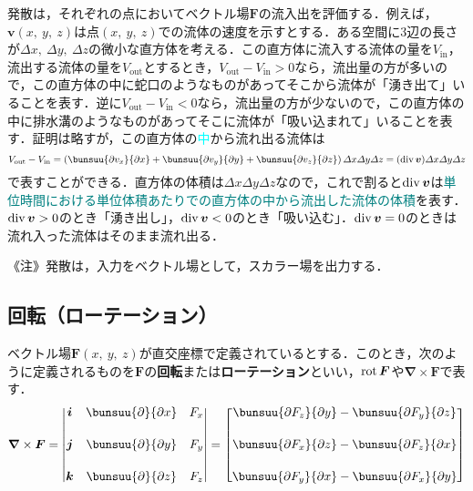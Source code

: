 発散は，それぞれの点においてベクトル場$\bm{F}$の流入出を評価する．例えば，$\bm{v}(x,\ y,\ z)$は点$(x,\ y,\ z)$での流体の速度を示すとする．ある空間に3辺の長さが$\varDelta x,\ \varDelta y,\ \varDelta z$の微小な直方体を考える．この直方体に流入する流体の量を$V_{\mathrm{in}}$，流出する流体の量を$V_{\mathrm{out}}$とするとき，$V_{\mathrm{out}} - V_{\mathrm{in}} > 0$なら，流出量の方が多いので，この直方体の中に蛇口のようなものがあってそこから流体が「湧き出て」いることを表す．逆に$V_{\mathrm{out}} - V_{\mathrm{in}} < 0$なら，流出量の方が少ないので，この直方体の中に排水溝のようなものがあってそこに流体が「吸い込まれて」いることを表す．証明は略すが，この直方体の\textcolor{cyan}{中}から流れ出る流体は
\begin{equation*}
	V_{\mathrm{out}} - V_{\mathrm{in}} = 
	\left(
		\bunsuu{\partial v_x}{\partial x} + \bunsuu{\partial v_y}{\partial y} + \bunsuu{\partial v_z}{\partial z}
	\right)
	\varDelta x \varDelta y \varDelta z
	= (\dive \bm{v}) \varDelta x \varDelta y \varDelta z
\end{equation*}
で表すことができる．直方体の体積は$\varDelta x \varDelta y \varDelta z$なので，これで割ると$\operatorname{div} \bm{v}$は\textcolor{teal}{単位時間における単位体積あたりでの直方体の中から流出した流体の体積}を表す．$\operatorname{div}\bm{v} > 0$のとき「湧き出し」，$\operatorname{div}\bm{v} < 0$のとき「吸い込む」．$\operatorname{div}\bm{v} = 0$のときは流れ入った流体はそのまま流れ出る．

《注》発散は，入力をベクトル場として，スカラー場を出力する．



\subsection{回転（ローテーション）}

ベクトル場$\bm{F}(x,\ y,\ z)$が直交座標で定義されているとする．このとき，次のように定義されるものを$\bm{F}$の\textbf{回転}または\textbf{ローテーション}といい，$\operatorname{rot} \bm{F}$や$\bm{\nabla} \times \bm{F}$で表す．
\begin{equation}
	\bm{\nabla} \times \bm{F} =
	\begin{vmatrix}
		\bm{i} & \bunsuu{\partial}{\partial x} & F_x\\[5mm]
		\bm{j} & \bunsuu{\partial}{\partial y} & F_y\\[5mm]
		\bm{k} & \bunsuu{\partial}{\partial z} & F_z\\
	\end{vmatrix}
	=
	\begin{bmatrix}
		\bunsuu{\partial F_z}{\partial y} -
		\bunsuu{\partial F_y}{\partial z}\\[5mm]
		\bunsuu{\partial F_x}{\partial z} -
		\bunsuu{\partial F_z}{\partial x}\\[5mm]
		\bunsuu{\partial F_y}{\partial x} -
		\bunsuu{\partial F_x}{\partial y}
	\end{bmatrix}
\end{equation}


